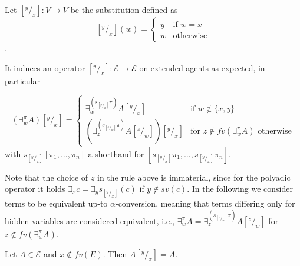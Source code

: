 \documentclass{llncs}
\newcommand{\tell}{{\bf tell}}
\newcommand{\ask}{{\bf ask}}
\newcommand{\ostop}{{\bf stop}}
\newcommand{\rarrow}{\rightarrow}
\begin{document}
\begin{definition}[Substitutions]
Let $[^y/_x]: V \to V$ be the substitution defined as
\[ [^y/_x](w) = 
		\begin{cases} 
			y & \text{if $w = x$} \\
            w & \text{otherwise}
        \end{cases} \].

It induces an operator $[^y/_x]: \mathcal{E} \rarrow \mathcal{E}$ on extended agents as expected,  in particular

        $$(\exists^{\pi}_w A)[^y/_x] = \begin{cases} 
			\exists^{(s_{[^y/_x]} \pi)}_w A[^y/_x]  & \text{if } w \not \in \{x, y\} \\
             (\exists^{(s_{[^z/_w]} \pi)}_z A[^z/_w])[^y/_x] & \text{for } z \not \in fv(\exists^{\pi}_w A) \text{ otherwise}
        \end{cases}$$
with $s_{[^y/_x]} [ \pi_1, \ldots, \pi_n ]$ a shorthand for $[s_{[^y/_x]} \pi_1, \ldots, s_{[^y/_x]} \pi_n]$.
\end{definition}

Note that the choice of $z$ in the rule above is immaterial, since for the polyadic operator it holds
$\exists_x c = \exists_y s_{[^y/_x]}(c)$ if $y \not \in sv(c)$.
%
In the following we consider terms to be equivalent up-to $\alpha$-conversion, meaning that terms 
differing only for hidden variables are considered equivalent, i.e.,
$\exists_w^\pi A = \exists_z^{(s_{[^z/_w]}\pi)} A[^z/_w]$ for $z \not \in fv(\exists^{\pi}_w A)$.

\begin{lemma}
Let $A \in \mathcal{E}$ and $x \not \in fv(E)$. Then $A[^y/_x] = A$.
\end{lemma}
\end{document}
